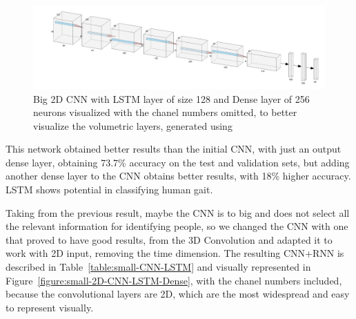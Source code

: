 \documentclass[12pt]{article}
\theoremstyle{definition}
\begin{document}
	\begin{figure}
		\includegraphics[width=\textwidth]{networks/big-2D-CNN-LSTM-Dense.png}
		\caption{Big 2D CNN with LSTM layer of size 128 and Dense layer of 256 neurons visualized with the chanel numbers omitted, to better visualize the volumetric layers, generated using \cite{nn-svg}}
		\label{figure:big-2D-CNN-LSTM-Dense}
	\end{figure}

	This network obtained better results than the initial CNN, with just an output dense layer, obtaining 73.7\% accuracy on the test and validation sets, but adding another dense layer to the CNN obtains better results, with 18\% higher accuracy. LSTM shows potential in classifying human gait.

	Taking from the previous result, maybe the CNN is to big and does not select all the relevant information for identifying people, so we changed the CNN with one that proved to have good results, from the 3D Convolution and adapted it to work with 2D input, removing the time dimension. The resulting CNN+RNN is described in Table~\ref{table:small-CNN-LSTM} and visually represented in Figure~\ref{figure:small-2D-CNN-LSTM-Dense}, with the chanel numbers included, because the convolutional layers are 2D, which are the most widespread and easy to represent visually.
\end{document}
